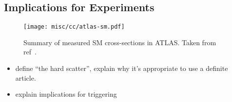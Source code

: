 \subsection{Implications for Experiments}
\label{sec:det-design}
\begin{figure}
  \texttt{[image: misc/cc/atlas-sm.pdf]}
  \caption[Summary of measured SM cross-sections in ATLAS]{%
Summary of measured SM cross-sections in ATLAS. Taken from ref~\cite{atlas-sm}.
}
\end{figure}
\begin{itemize}
\item define ``the hard scatter'', explain why it's appropriate to use a definite article.
\item explain implications for triggering
\end{itemize}
